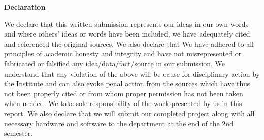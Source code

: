 \begin{center}
{\huge \bf Declaration}
\end{center}

We declare that this written submission represents our ideas in our own words and where others' ideas or words have been included, we have adequately cited and referenced the original sources. We also declare that We have adhered to all principles of academic honesty and integrity and have not misrepresented or fabricated or falsified any idea/data/fact/source in our submission. We understand that any violation of the above will be cause for disciplinary action by the Institute and can also evoke penal action from the sources which have thus not been properly cited or from whom proper permission has not been taken when needed. We take sole responsibility of the work presented by us in this report. We also declare that we will submit our completed project along with all necessary hardware and software to the department at the end of the 2nd semester.\\\\
